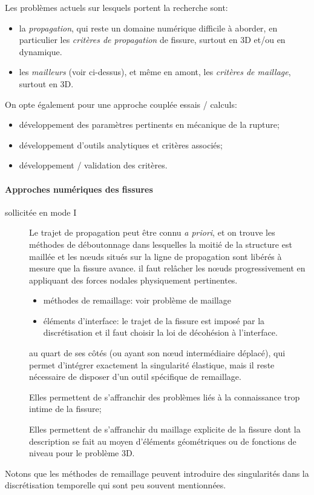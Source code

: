 \medskip
Les problèmes actuels sur lesquels portent la recherche sont:
\begin{itemize}
  \item la \emph{propagation}, qui reste un domaine numérique difficile à aborder, en 	particulier les \emph{critères de propagation} de fissure, surtout en 3D et/ou en dynamique.
  \item les \emph{mailleurs} (voir ci-dessus), et même en amont, les \emph{critères de maillage}, surtout en 3D.	
\end{itemize}
\medskipvm
On opte également pour une approche couplée essais / calculs:
\begin{itemize}
  \item développement des paramètres pertinents en mécanique de la rupture;
  \item développement d'outils analytiques et critères associés;
  \item développement / validation des critères.
\end{itemize}

\paragraph{Approches numériques des fissures}
\begin{description}
  \item[ sollicitée en mode I]
	Le trajet de propagation peut être connu \emph{a priori}, et on trouve les
	méthodes de déboutonnage dans lesquelles la moitié de la structure est
	maillée et les nœuds situés sur la ligne de propagation sont libérés
	à mesure que la fissure avance.  il faut relâcher les nœuds
	progressivement en appliquant des forces nodales physiquement
	pertinentes.
  \item[]\mbox{}
\begin{itemize}
\item méthodes de remaillage:
	voir problème de maillage
  \item éléments d'interface:
	le trajet de la fissure est imposé par la discrétisation et il faut choisir
	la loi de décohésion à l'interface.
	\end{itemize}
  \item[]
	au quart de ses côtés (ou ayant son nœud intermédiaire déplacé), qui
	permet d'intégrer exactement la singularité élastique, mais il reste
	nécessaire de disposer d'un outil spécifique de remaillage.
  \item[] Elles permettent de s'affranchir
	des problèmes liés à la connaissance trop intime de la fissure;
  \item[]
	Elles permettent de s'affranchir du maillage explicite de la fissure dont la
	description se fait au moyen d'éléments géométriques ou de fonctions
	de niveau pour le problème 3D.
\end{description}
Notons que les méthodes de remaillage peuvent introduire des singularités dans la discrétisation temporelle qui sont peu souvent mentionnées.



